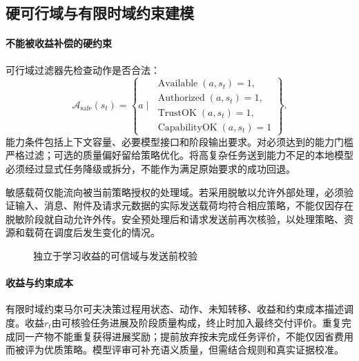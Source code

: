 \subsection{硬可行域与有限时域约束建模}

\paragraph{不能被收益补偿的硬约束}
可行域过滤器先检查动作是否合法：
\begin{equation}
\mathcal{A}_{\mathrm{safe}}(s_t)=
\left\{a\mid
\begin{array}{l}
\operatorname{Available}(a,s_t)=1,\\
\operatorname{Authorized}(a,s_t)=1,\\
\operatorname{TrustOK}(a,s_t)=1,\\
\operatorname{CapabilityOK}(a,s_t)=1
\end{array}\right\}.
\label{eq:placement_safe_set}
\end{equation}
能力条件包括上下文容量、必要模型接口和阶段输出要求。对必须达到的能力门槛严格过滤；可选的质量偏好留给策略优化。将高复杂任务送到能力不足的本地模型必须经过显式任务降级或拆分，不能作为满足原始要求的成功回退。

敏感载荷仅能流向被当前策略授权的处理域。若采用脱敏以允许外部处理，必须验证输入、消息、附件及请求元数据的实际发送载荷均符合相应策略，不能仅因存在脱敏阶段就自动允许外传。安全预处理后和请求发送前再次核验，以处理策略、资源和载荷在调度后发生变化的情况。

\begin{figure}[htbp]
\centering
{}
\caption{独立于学习收益的可信域与发送前校验}
\label{fig:placement-trusted-path}
\end{figure}

\paragraph{收益与约束成本}
有限时域约束马尔可夫决策过程用状态、动作、未知转移、收益和约束成本描述调度。收益$r_t$由可核验任务进展及阶段质量构成，终止时加入最终交付评价。重复完成同一产物不能重复获得进展奖励；提前放弃按未完成任务评价，不能仅因省费用而被评为优质策略。模型评审可补充语义质量，但需结合规则和真实证据校准。

